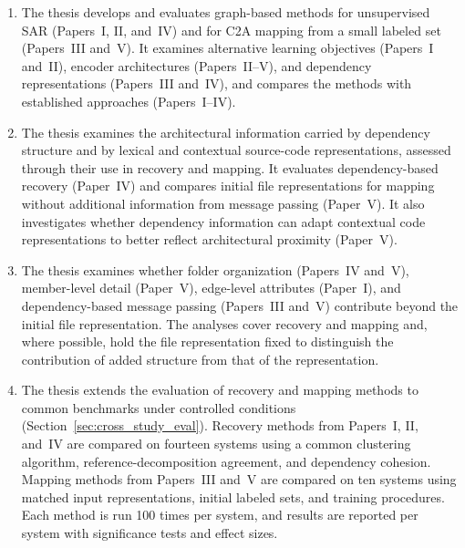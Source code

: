 \begin{enumerate}[leftmargin=1em, itemsep=1pt]

    \item {}
    The thesis develops and evaluates graph-based methods for unsupervised SAR (Papers~I, II, and~IV) and for C2A mapping from a small labeled set (Papers~III and~V). It examines alternative learning objectives (Papers~I and~II), encoder architectures (Papers~II--V), and dependency representations (Papers~III and~IV), and compares the methods with established approaches (Papers~I--IV).
 
    \item {}
    The thesis examines the architectural information carried by dependency structure and by lexical and contextual source-code representations, assessed through their use in recovery and mapping. It evaluates dependency-based recovery (Paper~IV) and compares initial file representations for mapping without additional information from message passing (Paper~V). It also investigates whether dependency information can adapt contextual code representations to better reflect architectural proximity (Paper~V).
 
    \item {}
    The thesis examines whether folder organization (Papers~IV and~V), member-level detail (Paper~V), edge-level attributes (Paper~I), and dependency-based message passing (Papers~III and~V) contribute beyond the initial file representation. The analyses cover recovery and mapping and, where possible, hold the file representation fixed to distinguish the contribution of added structure from that of the representation.
 
    \item {}
    The thesis extends the evaluation of recovery and mapping methods to common benchmarks under controlled conditions (Section~\ref{sec:cross_study_eval}). Recovery methods from Papers~I, II, and~IV are compared on fourteen systems using a common clustering algorithm, reference-decomposition agreement, and dependency cohesion. Mapping methods from Papers~III and~V are compared on ten systems using matched input representations, initial labeled sets, and training procedures. Each method is run 100 times per system, and results are reported per system with significance tests and effect sizes.
    
\end{enumerate}

